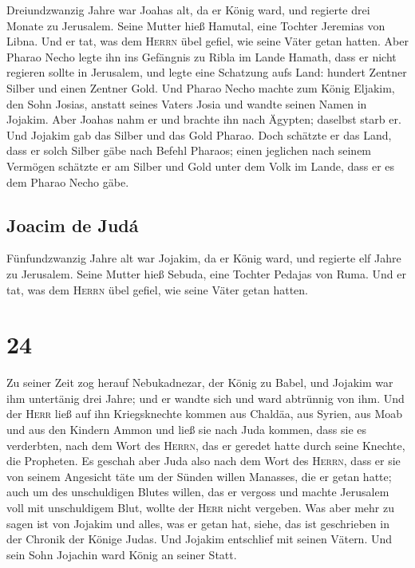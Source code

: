  Dreiundzwanzig Jahre war Joahas alt, da er König ward,
und regierte drei Monate zu Jerusalem. Seine Mutter hieß Hamutal, eine
Tochter Jeremias von Libna.  Und er tat, was dem
\textsc{Herrn} übel gefiel, wie seine Väter getan hatten.
 Aber Pharao Necho legte ihn ins Gefängnis zu Ribla im
Lande Hamath, dass er nicht regieren sollte in Jerusalem, und legte eine
Schatzung aufs Land: hundert Zentner Silber und einen Zentner Gold.
 Und Pharao Necho machte zum König Eljakim, den Sohn
Josias, anstatt seines Vaters Josia und wandte seinen Namen in Jojakim.
Aber Joahas nahm er und brachte ihn nach Ägypten; daselbst starb er.
 Und Jojakim gab das Silber und das Gold Pharao. Doch
schätzte er das Land, dass er solch Silber gäbe nach Befehl Pharaos;
einen jeglichen nach seinem Vermögen schätzte er am Silber und Gold
unter dem Volk im Lande, dass er es dem Pharao Necho gäbe.

\hypertarget{joacim-de-juduxe1}{%
\subsection{Joacim de Judá}\label{joacim-de-juduxe1}}

 Fünfundzwanzig Jahre alt war Jojakim, da er König ward,
und regierte elf Jahre zu Jerusalem. Seine Mutter hieß Sebuda, eine
Tochter Pedajas von Ruma.  Und er tat, was dem
\textsc{Herrn} übel gefiel, wie seine Väter getan hatten.

\hypertarget{section-23}{%
\section{24}\label{section-23}}

 Zu seiner Zeit zog herauf Nebukadnezar, der König zu
Babel, und Jojakim war ihm untertänig drei Jahre; und er wandte sich und
ward abtrünnig von ihm.  Und der \textsc{Herr} ließ auf
ihn Kriegsknechte kommen aus Chaldäa, aus Syrien, aus Moab und aus den
Kindern Ammon und ließ sie nach Juda kommen, dass sie es verderbten,
nach dem Wort des \textsc{Herrn}, das er geredet hatte durch seine
Knechte, die Propheten.  Es geschah aber Juda also nach
dem Wort des \textsc{Herrn}, dass er sie von seinem Angesicht täte um
der Sünden willen Manasses, die er getan hatte;  auch um
des unschuldigen Blutes willen, das er vergoss und machte Jerusalem voll
mit unschuldigem Blut, wollte der \textsc{Herr} nicht vergeben.
 Was aber mehr zu sagen ist von Jojakim und alles, was er
getan hat, siehe, das ist geschrieben in der Chronik der Könige Judas.
 Und Jojakim entschlief mit seinen Vätern. Und sein Sohn
Jojachin ward König an seiner Statt.

